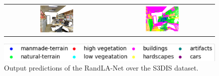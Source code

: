 \begin{figure}
\begin{tabular}{cc}
            \includegraphics[width=0.33\textwidth, height=0.18\textheight]{images/seg_output/s3dis_DE/S3DIS_4_RGB.png} &
            \includegraphics[width=0.33\textwidth, height=0.18\textheight]{images/seg_output/s3dis_DE/S3DIS_4_Pred.png}\\
        \end{tabular}
        \includegraphics[scale=0.65]{images/legend.png}
        \caption{Output predictions of the RandLA-Net over the S3DIS dataset.}
    \end{figure}
    
